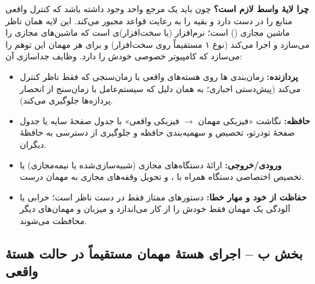 \textbf{چرا لایهٔ واسط لازم است؟} چون باید یک مرجع واحد وجود داشته باشد که کنترل واقعی منابع را در دست دارد و بقیه را به رعایت قواعد مجبور می‌کند. این لایه همان ناظر ماشین مجازی () است؛ نرم‌افزار (یا سخت‌افزار)ی است که ماشین‌های مجازی را می‌سازد و اجرا می‌کند (نوع ۱ مستقیماً روی سخت‌افزار) و برای هر مهمان این توهم را می‌سازد که کامپیوتر خصوصی خودش را دارد. وظایف جداسازی آن:
\begin{itemize}
  \item \textbf{پردازنده:} زمان‌بندی ها روی هسته‌های واقعی با زمان‌سنجی که فقط ناظر کنترل می‌کند (پیش‌دستی اجباری؛ به همان دلیل که سیستم‌عامل با زمان‌سنج از انحصار پردازه‌ها جلوگیری می‌کند).
  \item \textbf{حافظه:} نگاشت «فیزیکی مهمان $\rightarrow$ فیزیکی واقعی» با جدول صفحهٔ سایه یا جدول صفحهٔ تودرتو، تخصیص و سهمیه‌بندی حافظه و جلوگیری از دسترسی به حافظهٔ دیگران.
  \item \textbf{ورودی/خروجی:} ارائهٔ دستگاه‌های مجازی (شبیه‌سازی‌شده یا نیمه‌مجازی) یا تخصیص اختصاصی دستگاه همراه با ، و تحویل وقفه‌های مجازی به مهمان درست.
  \item \textbf{حفاظت از خود و مهار خطا:} دستورهای ممتاز فقط در دست ناظر است؛ خرابی یا آلودگی یک مهمان فقط خودش را از کار می‌اندازد و میزبان و مهمان‌های دیگر محافظت می‌شوند.
\end{itemize}

\subsection*{بخش ب – اجرای هستهٔ مهمان مستقیماً در حالت هستهٔ واقعی}

